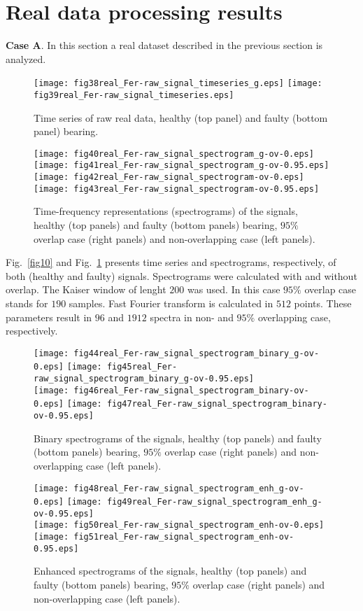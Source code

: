 \documentclass[3p,times]{elsarticle}
\begin{document}
\section{Real data processing results}\label{real}
\textbf{Case A}. In this section a real dataset  described in the previous section is analyzed.
\begin{figure}[!ht]
\begin{center}
\texttt{[image: fig38real\_Fer-raw\_signal\_timeseries\_g.eps]}
\texttt{[image: fig39real\_Fer-raw\_signal\_timeseries.eps]}
\caption{Time series of raw real data, healthy (top panel) and faulty (bottom panel) bearing.}
\label{fig10}
\texttt{[image: fig40real\_Fer-raw\_signal\_spectrogram\_g-ov-0.eps]}
\texttt{[image: fig41real\_Fer-raw\_signal\_spectrogram\_g-ov-0.95.eps]}\\
\texttt{[image: fig42real\_Fer-raw\_signal\_spectrogram-ov-0.eps]}
\texttt{[image: fig43real\_Fer-raw\_signal\_spectrogram-ov-0.95.eps]}
\caption{Time-frequency representations (spectrograms) of the signals, healthy (top panels) and faulty (bottom panels) bearing, $95\%$ overlap case (right panels) and non-overlapping case (left panels).}
\label{fig11}
\end{center}
\end{figure}
Fig.~\ref{fig10} and Fig.~\ref{fig11} presents time series and spectrograms, respectively, of both (healthy and faulty) signals. Spectrograms were calculated with and without overlap. The Kaiser window of lenght $200$ was used. In this case  $95\%$ overlap case stands for $190$ samples. Fast Fourier transform is calculated in $512$ points. These parameters result in $96$ and $1912$ spectra in non- and $95\%$ overlapping case, respectively.\\
\begin{figure}[!ht]
\begin{center}
\texttt{[image: fig44real\_Fer-raw\_signal\_spectrogram\_binary\_g-ov-0.eps]}
\texttt{[image: fig45real\_Fer-raw\_signal\_spectrogram\_binary\_g-ov-0.95.eps]}\\
\texttt{[image: fig46real\_Fer-raw\_signal\_spectrogram\_binary-ov-0.eps]}
\texttt{[image: fig47real\_Fer-raw\_signal\_spectrogram\_binary-ov-0.95.eps]}
\caption{Binary spectrograms of the signals, healthy (top panels) and faulty (bottom panels) bearing, $95\%$ overlap case (right panels) and non-overlapping case (left panels).}
\label{fig12}
\texttt{[image: fig48real\_Fer-raw\_signal\_spectrogram\_enh\_g-ov-0.eps]}
\texttt{[image: fig49real\_Fer-raw\_signal\_spectrogram\_enh\_g-ov-0.95.eps]}\\
\texttt{[image: fig50real\_Fer-raw\_signal\_spectrogram\_enh-ov-0.eps]}
\texttt{[image: fig51real\_Fer-raw\_signal\_spectrogram\_enh-ov-0.95.eps]}
\caption{Enhanced spectrograms of the signals, healthy (top panels) and faulty (bottom panels) bearing, $95\%$ overlap case (right panels) and non-overlapping case (left panels).}
\label{fig13}
\end{center}
\end{figure}
\end{document}
